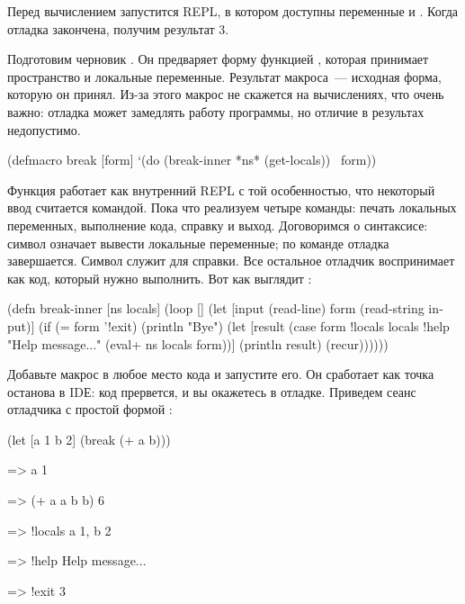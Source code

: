 Перед вычислением  запустится REPL, в котором доступны переменные  и . Когда отладка закончена, получим результат 3.

Подготовим черновик . Он предваряет форму функцией , которая принимает пространство и локальные переменные. Результат макроса~--- исходная форма, которую он принял. Из-за этого макрос не скажется на вычислениях, что очень важно: отладка может замедлять работу программы, но отличие в результах недопустимо.

\begin{english}
  \begin{clojure}
(defmacro break
  [form]
  `(do
     (break-inner *ns* (get-locals))
     ~form))
  \end{clojure}
\end{english}

Функция  работает как внутренний REPL с той особенностью, что некоторый ввод считается командой. Пока что реализуем четыре команды: печать локальных переменных, выполнение кода, справку и выход. Договоримся о синтаксисе: символ  означает вывести локальные переменные; по команде  отладка завершается. Символ  служит для справки. Все остальное отладчик воспринимает как код, который нужно выполнить. Вот как выглядит :

\pagebreaklarge

\begin{english}
  \begin{clojure}
(defn break-inner [ns locals]
  (loop []
    (let [input (read-line)
          form (read-string input)]
      (if (= form '!exit)
        (println "Bye")
        (let [result
              (case form
                !locals locals
                !help "Help message..."
                (eval+ ns locals form))]
          (println result)
          (recur))))))
  \end{clojure}
\end{english}

Добавьте макрос  в любое место кода и запустите его. Он сработает как точка останова в IDЕ: код прервется, и вы окажетесь в отладке. Приведем сеанс отладчика с простой формой :

\begin{english}
  \begin{clojure}
(let [a 1 b 2]
  (break (+ a b)))

=> a
1

=> (+ a a b b)
6

=> !locals
{a 1, b 2}

=> !help
Help message...

=> !exit
3
  \end{clojure}
\end{english}

